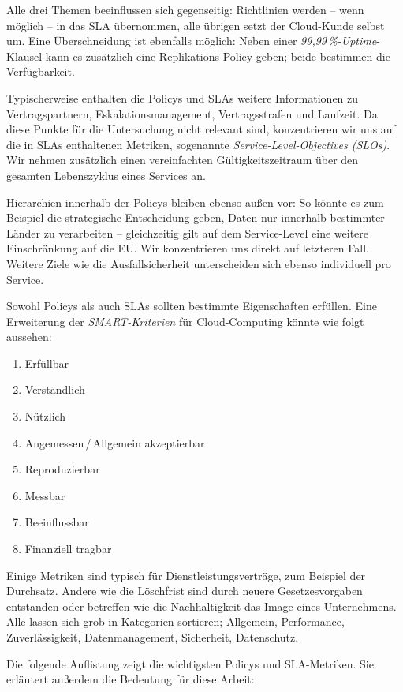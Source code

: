 Alle drei Themen beeinflussen sich gegenseitig: Richtlinien werden -- wenn möglich -- in das SLA übernommen, alle übrigen setzt der Cloud-Kunde selbst um. Eine Überschneidung ist ebenfalls möglich: Neben einer \emph{99,99\,\%-Uptime}-Klausel kann es zusätzlich eine Replikations-Policy geben; beide bestimmen die Verfügbarkeit.

Typischerweise enthalten die Policys und SLAs weitere Informationen zu Vertragspartnern, Eskalationsmanagement, Vertragsstrafen und Laufzeit. Da diese Punkte für die Untersuchung nicht relevant sind, konzentrieren wir uns auf die in SLAs enthaltenen Metriken, sogenannte \emph{Service-Level-Objectives (SLOs)}. Wir nehmen zusätzlich einen vereinfachten Gültigkeitszeitraum über den gesamten Lebenszyklus eines Services an.

Hierarchien innerhalb der Policys bleiben ebenso außen vor: So könnte es zum Beispiel die strategische Entscheidung geben, Daten nur innerhalb bestimmter Länder zu verarbeiten -- gleichzeitig gilt auf dem Service-Level eine weitere Einschränkung auf die EU. Wir konzentrieren uns direkt auf letzteren Fall. Weitere Ziele wie die Ausfallsicherheit unterscheiden sich ebenso individuell pro Service.

Sowohl Policys als auch SLAs sollten bestimmte Eigenschaften erfüllen. Eine Erweiterung der \emph{SMART-Kriterien} \cite{doran:1981:smart-goals} für Cloud-Computing könnte wie folgt aussehen:

\begin{enumerate}
	\item Erfüllbar
	\item Verständlich
	\item Nützlich
	\item Angemessen\,/\,Allgemein akzeptierbar
	\item Reproduzierbar
	\item Messbar
	\item Beeinflussbar
	\item Finanziell tragbar
\end{enumerate}

Einige Metriken sind typisch für Dienstleistungsverträge, zum Beispiel der Durchsatz. Andere wie die Löschfrist sind durch neuere Gesetzesvorgaben entstanden oder betreffen wie die Nachhaltigkeit das Image eines Unternehmens. Alle lassen sich grob in Kategorien sortieren; Allgemein, Performance, Zuverlässigkeit, Datenmanagement, Sicherheit, Datenschutz.

Die folgende Auflistung zeigt die wichtigsten Policys und SLA-Metriken. Sie erläutert außerdem die Bedeutung für diese Arbeit:

